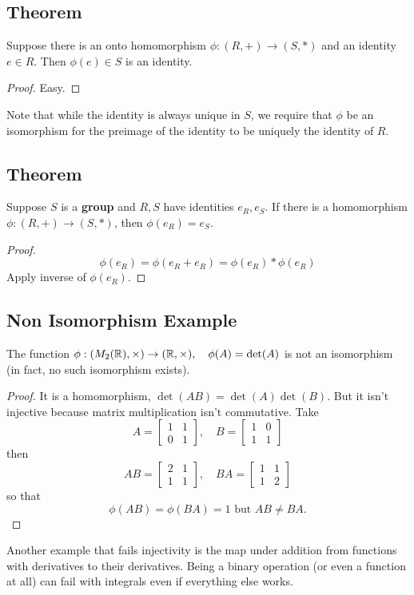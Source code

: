 \subsection*{Theorem}
Suppose there is an onto homomorphism $\phi:(R,+) \to (S,*)$ and an identity $e \in R$. Then $\phi(e) \in S$ is an identity.
\begin{proof}
Easy.
\end{proof}
Note that while the identity is always unique in $S$, we require that $\phi$ be an isomorphism for the preimage of the identity to be uniquely the identity of $R$.
\subsection*{Theorem}
Suppose $S$ is a \textbf{group} and $R,S$ have identities $e_R,e_S$. If there is a homomorphism $\phi:(R,+) \to (S,*)$, then $\phi(e_R) = e_S$.
\begin{proof}
$$
\phi(e_R) = \phi(e_R+e_R) = \phi(e_R) * \phi(e_R)
$$
Apply inverse of $\phi(e_R)$.
\end{proof}
\subsection*{Non Isomorphism Example}
The function $\phi: (M_2(\operatorname{\mathbb{R}}),\times) \to (\operatorname{\mathbb{R}},\times), \quad \phi(A) = \det(A)$ is not an isomorphism (in fact, no such isomorphism exists).
\begin{proof}
It is a homomorphism, $\det(AB) = \det(A)\det(B)$. But it isn't injective because matrix multiplication isn't commutative.
Take $$A = \begin{bmatrix}
1 & 1 \\
0 & 1
\end{bmatrix},\quad B =
\begin{bmatrix}
1 & 0 \\
1 & 1
\end{bmatrix}
$$
then $$
AB = \begin{bmatrix}
2 & 1 \\
1 & 1
\end{bmatrix},\quad BA =
\begin{bmatrix}
1 & 1 \\
1 & 2
\end{bmatrix}
$$
so that $$
\phi(AB) = \phi(BA) = 1 \text{ but } AB \neq BA.
$$
\end{proof}
\noindent Another example that fails injectivity is the map under addition from functions with derivatives to their derivatives.
Being a binary operation (or even a function at all) can fail with integrals even if everything else works.
